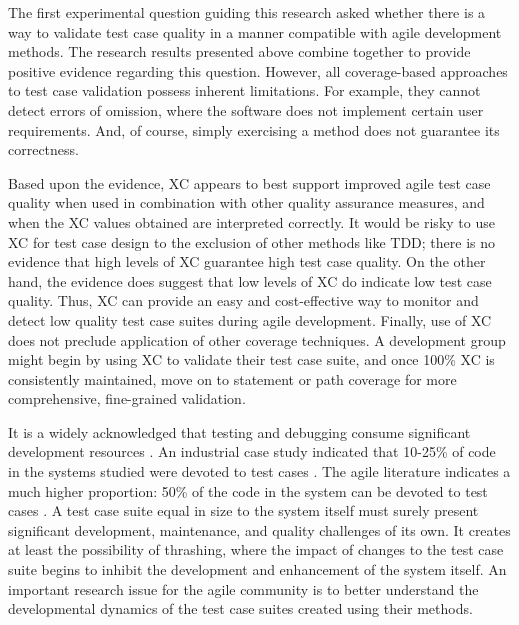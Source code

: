 \documentclass[10pt,twocolumn]{article}
\begin{document}
\label{sec:quality}

The first experimental question guiding this research asked whether there
is a way to validate test case quality in a manner compatible with agile
development methods. The research results presented above combine together
to provide positive evidence regarding this question. However, all
coverage-based approaches to test case validation possess inherent
limitations. For example, they cannot detect errors of omission, where the
software does not implement certain user requirements. And, of course,
simply exercising a method does not guarantee its correctness.

Based upon the evidence, XC appears to best support improved agile test case
quality when used in combination with other quality assurance measures, and
when the XC values obtained are interpreted correctly.  It would be risky
to use XC for test case design to the exclusion of other methods like TDD;
there is no evidence that high levels of XC guarantee high test case
quality.  On the other hand, the evidence does suggest that low levels of
XC do indicate low test case quality. Thus, XC can provide an easy and
cost-effective way to monitor and detect low quality test case suites
during agile development.  Finally, use of XC does not preclude application
of other coverage techniques. A development group might begin by using XC
to validate their test case suite, and once 100\% XC is consistently maintained, 
move on to statement or path coverage for more comprehensive, fine-grained
validation. 

\label{sec:UTD}

It is a widely acknowledged that testing and debugging consume significant
development resources \cite{Beizer:1990}. An industrial case study
indicated that 10-25\% of code in the systems studied were devoted to test cases
\cite{Yamaura:1998}.  The agile literature indicates a much higher
proportion: 50\% of the code in the system can be devoted to test cases
\cite{Beck:2003}.  A test case suite equal in size to the system itself
must surely present significant development, maintenance, and quality challenges
of its own. It creates at least the possibility of thrashing, where the
impact of changes to the test case suite begins to inhibit the development
and enhancement of the system itself. An important research issue for
the agile community is to better understand the developmental dynamics of
the test case suites created using their methods. 
\end{document}
